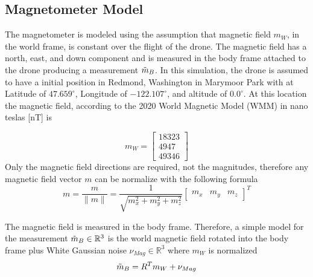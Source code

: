 \subsection{Magnetometer Model}

The magnetometer is modeled using the assumption that magnetic field $m_W$, in the world frame, is constant over the flight of the drone. The magnetic field has a north, east, and down component and is measured in the body frame attached to the drone producing a measurement $\Tilde{m}_B$. In this simulation, the drone is assumed to have a initial position in Redmond, Washington in Marymoor Park with at Latitude of $47.659^{\circ}$, Longitude of $-122.107^{\circ}$, and altitude of $0.0^{\circ}$. At this location the magnetic field, according to the 2020 World Magnetic Model (WMM) in nano teslas [nT] is \cite{wmm_calc}

\begin{equation}
    m_W = \begin{bmatrix}
        18323 \\
        4947 \\
        49346 
    \end{bmatrix}
    \label{eq: m_W not normalized}
\end{equation}
Only the magnetic field directions are required, not the magnitudes, therefore any magnetic field vector $m$ can be normalize with the following formula
\begin{equation}
    m = \frac{m}{\lVert m \rVert} = \frac{1}{\sqrt{m_x^2 + m_y^2 + m_z^2}} \begin{bmatrix}
        m_x & m_y & m_z
    \end{bmatrix}^T
    \label{eq: normalize mag field}
\end{equation}

The magnetic field is measured in the body frame. Therefore, a simple model for the measurement $\Tilde{m}_B \in \mathbb{R}^3$ is the world magnetic field rotated into the body frame plus White Gaussian noise $\nu_{Mag} \in \mathbb{R}^3$ where $m_W$ is normalized \cite{ahrs_ekf}
\begin{equation}
    \Tilde{m}_B = R^T m_W + \nu_{Mag}
    \label{eq: mag measurement model}
\end{equation}


